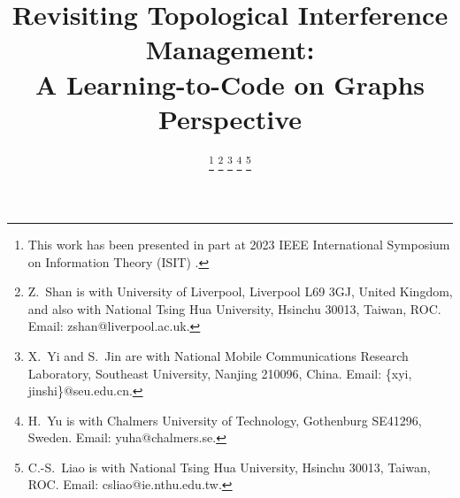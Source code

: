\documentclass[a4paper,journal]{IEEEtran}
\def\A {\mathbb{A}}
\begin{document}
\title{Revisiting Topological Interference Management: \\A Learning-to-Code on Graphs Perspective
} 

\author{

\thanks{This work has been presented in part at 2023 IEEE International Symposium on Information Theory (ISIT) \cite{10206636}.}
\thanks{Z.~Shan is with University of Liverpool, Liverpool L69 3GJ, United Kingdom, and also with National Tsing Hua University, Hsinchu 30013, Taiwan, ROC. Email: zshan@liverpool.ac.uk.}
\thanks{X.~Yi and S.~Jin are with National Mobile Communications Research Laboratory, Southeast University, Nanjing 210096, China. Email: \{xyi, jinshi\}@seu.edu.cn.}
\thanks{H.~Yu is with Chalmers University of Technology, Gothenburg SE41296, Sweden. Email:                  yuha@chalmers.se.}
\thanks{C.-S.~Liao is with National Tsing Hua University, Hsinchu 30013, Taiwan, ROC. Email:                      csliao@ie.nthu.edu.tw.}
}
\end{document}
